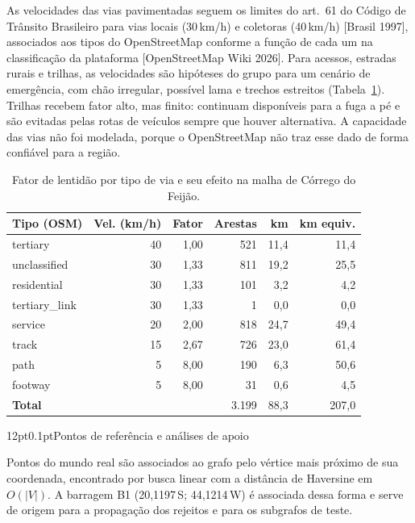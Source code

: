 \documentclass[12pt,a4paper]{article}
\makeatletter
\renewcommand\subsection{\@startsection{subsection}{2}{\z@}%
  {12pt}{0.1pt}{\normalfont\normalsize\bfseries}}
\makeatother
\begin{document}
As velocidades das vias pavimentadas seguem os limites do art.~61 do Código de Trânsito Brasileiro para vias locais (30\,km/h) e coletoras (40\,km/h) [Brasil 1997], associados aos tipos do OpenStreetMap conforme a função de cada um na classificação da plataforma [OpenStreetMap Wiki 2026]. Para acessos, estradas rurais e trilhas, as velocidades são hipóteses do grupo para um cenário de emergência, com chão irregular, possível lama e trechos estreitos (Tabela~\ref{tab:lentidao}). Trilhas recebem fator alto, mas finito: continuam disponíveis para a fuga a pé e são evitadas pelas rotas de veículos sempre que houver alternativa. A capacidade das vias não foi modelada, porque o OpenStreetMap não traz esse dado de forma confiável para a região.

\begin{table}[!htb]
\caption{Fator de lentidão por tipo de via e seu efeito na malha de Córrego do Feijão.}
\label{tab:lentidao}
\centering\small
\begin{tabular}{@{}lrrrrr@{}}
\toprule
\textbf{Tipo (OSM)} & \textbf{Vel. (km/h)} & \textbf{Fator} & \textbf{Arestas} & \textbf{km} & \textbf{km equiv.}\\
\midrule
tertiary              & 40 & 1,00 & 521 & 11,4 & 11,4\\
unclassified          & 30 & 1,33 & 811 & 19,2 & 25,5\\
residential           & 30 & 1,33 & 101 &  3,2 &  4,2\\
tertiary\_link        & 30 & 1,33 &   1 &  0,0 &  0,0\\
service               & 20 & 2,00 & 818 & 24,7 & 49,4\\
track                 & 15 & 2,67 & 726 & 23,0 & 61,4\\
path                  &  5 & 8,00 & 190 &  6,3 & 50,6\\
footway               &  5 & 8,00 &  31 &  0,6 &  4,5\\
\midrule
\textbf{Total}        &    &      & 3.199 & 88,3 & 207,0\\
\bottomrule
\end{tabular}
\end{table}

\subsection{Pontos de referência e análises de apoio}

Pontos do mundo real são associados ao grafo pelo vértice mais próximo de sua coordenada, encontrado por busca linear com a distância de Haversine em $O(|V|)$. A barragem B1 (20,1197\textdegree\,S; 44,1214\textdegree\,W) é associada dessa forma e serve de origem para a propagação dos rejeitos e para os subgrafos de teste.
\end{document}
